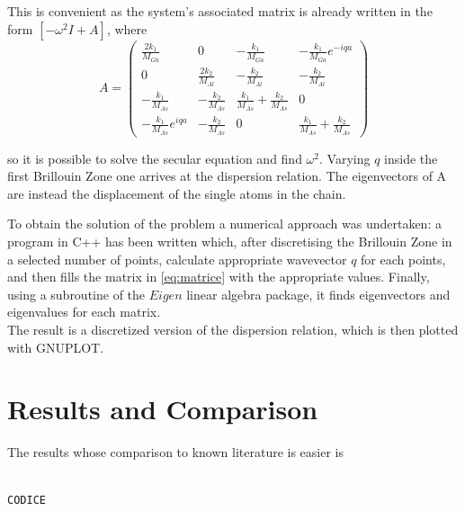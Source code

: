 \documentclass{article}
\begin{document}
This is convenient as the system's associated matrix is already written in the form $[-\omega^2I + A]$, where
\begin{equation} 
A = \begin{pmatrix}
   \frac{2k_1}{M_{Ga}}	& 0  & -\frac{k_1}{M_{Ga}}  & -\frac{k_1}{M_{Ga}}e^{-iqa}  \\ 
   0	& \frac{2k_2}{M_{Al}}  & -\frac{k_2}{M_{Al}}  & -\frac{k_2}{M_{Al}}  \\ 
   -\frac{k_1}{M_{As}} 	& -\frac{k_2}{M_{As}}   & \frac{k_1}{M_{As}}+\frac{k_2}{M_{As}}   & 0  \\ 
   -\frac{k_1}{M_{As}}e^{iqa} 	& -\frac{k_2}{M_{As}}  & 0  & \frac{k_1}{M_{As}}+\frac{k_2}{M_{As}}   
\end{pmatrix} 
\label{eq:matrice}
\end{equation}


so it is possible to solve the secular equation and find $\omega^2$. Varying $q$ inside the first Brillouin Zone one arrives at the dispersion relation. The eigenvectors of A are instead the displacement of the single atoms in the chain.\par
\medskip

To obtain the solution of the problem a numerical approach was undertaken: a program in C++ has been written which, after discretising the Brillouin Zone in a selected number of points, calculate appropriate wavevector $q$ for each points, and then fills the matrix in \autoref{eq:matrice} with the appropriate values. Finally, using a subroutine of the $Eigen$ linear algebra package, it finds eigenvectors and eigenvalues for each matrix.\\
The result is a discretized version of the dispersion relation, which is then plotted with GNUPLOT.

\section{Results and Comparison}
The results whose comparison to known literature is easier is 

\begin{lstlisting}[language=C++, caption={Subroutine norma \\ \emph{maodulo.f90}}]

CODICE

\end{lstlisting} 


	
\end{document}
